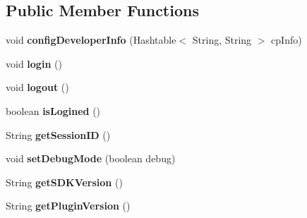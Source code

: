 \subsection*{Public Member Functions}
\begin{DoxyCompactItemize}
\item 
\mbox{\label{interfaceorg_1_1cocos2dx_1_1plugin_1_1InterfaceUser_a32c50fddbfe763d6939dc84961cd329d}} 
void {\bfseries config\+Developer\+Info} (Hashtable$<$ String, String $>$ cp\+Info)
\item 
\mbox{\label{interfaceorg_1_1cocos2dx_1_1plugin_1_1InterfaceUser_a9dcfd5917b1b2b56745277f330f63dc0}} 
void {\bfseries login} ()
\item 
\mbox{\label{interfaceorg_1_1cocos2dx_1_1plugin_1_1InterfaceUser_a55ec733f967fc6b519631e8fdc9abfac}} 
void {\bfseries logout} ()
\item 
\mbox{\label{interfaceorg_1_1cocos2dx_1_1plugin_1_1InterfaceUser_a8d0625f42330001ff6b967f833fe8258}} 
boolean {\bfseries is\+Logined} ()
\item 
\mbox{\label{interfaceorg_1_1cocos2dx_1_1plugin_1_1InterfaceUser_ae904d38b34e3bf8f6dc8bd77ee033697}} 
String {\bfseries get\+Session\+ID} ()
\item 
\mbox{\label{interfaceorg_1_1cocos2dx_1_1plugin_1_1InterfaceUser_aaf3915e2fc595480df3f54797196f065}} 
void {\bfseries set\+Debug\+Mode} (boolean debug)
\item 
\mbox{\label{interfaceorg_1_1cocos2dx_1_1plugin_1_1InterfaceUser_a7cb555134137b10fe436754fde1623f9}} 
String {\bfseries get\+S\+D\+K\+Version} ()
\item 
\mbox{\label{interfaceorg_1_1cocos2dx_1_1plugin_1_1InterfaceUser_a26d5de7a3e09f9c5eae2ffe25848470e}} 
String {\bfseries get\+Plugin\+Version} ()
\end{DoxyCompactItemize}

